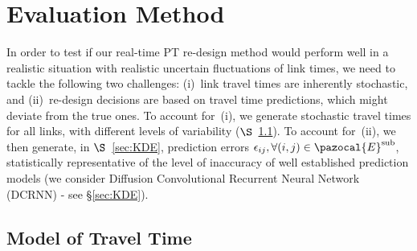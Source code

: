 \documentclass[a4paper,fleqn]{cas-sc}
\begin{document}


\section{Evaluation Method}\label{sec:evaMETHO}
%
In order to test if our real-time PT re-design method would perform well in a realistic situation with realistic uncertain fluctuations of link times, we need to tackle the following two challenges: (i)~link travel times are inherently stochastic, and (ii)~re-design decisions are based on travel time predictions, which might deviate from the true ones. To account for~(i), we generate stochastic travel times for all links, with different levels of variability ($\S$~\ref{sec:log_normal}). To account for~(ii), we then generate, in $\S$~\ref{sec:KDE}, prediction errors $\epsilon_{ij}, \forall (i,j) \in \pazocal{E}^{\text{sub}}$, statistically representative of the level of inaccuracy of well established prediction models (we consider Diffusion Convolutional Recurrent Neural Network (DCRNN) - see \S{}\ref{sec:KDE}). 

\subsection{Model of Travel Time}
\label{sec:log_normal}
\end{document}
